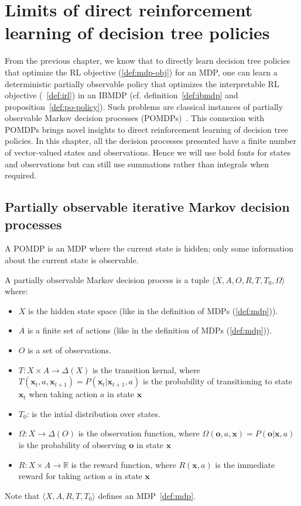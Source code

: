 \chapter{Limits of direct reinforcement learning of decision tree policies}\label{sec:pomdp}

From the previous chapter, we know that to directly learn decision tree policies that optimize the RL objective (\ref{def:mdp-obj}) for an MDP, one can learn a deterministic partially observable policy that optimizes the interpretable RL objective (~\ref{def:irl}) in an IBMDP (cf. definition~\ref{def:ibmdp} and proposition~\ref{def:po-policy}).
Such problems are classical instances of partially observable Markov decision processes (POMDPs)~\cite{POMDP,chap2}.
This connexion with POMDPs brings novel insights to direct reinforcement learning of decision tree policies. 
In this chapter, all the decision processes presented have a finite number of vector-valued states and observations.
Hence we will use bold fonts for states and observations but can still use summations rather than integrals when required.

\section{Partially observable iterative Markov decision processes}\label{sec:poibmdp}
A POMDP is an MDP where the current state is hidden; only some information about the current state is observable.

\begin{definition}\label{def:pomdp}
A partially observable Markov decision process is a tuple $\langle X, A, O, R, T, T_0, \Omega\rangle$ where:
\begin{itemize}
    \item $X$ is the hidden state space (like in the definition of MDPs (\ref{def:mdp})).
    \item $A$ is a finite set of actions (like in the definition of MDPs (\ref{def:mdp})).
    \item $O$ is a set of observations.
    \item $T: X \times A \rightarrow \Delta(X)$ is the transition kernal, where $T(\boldsymbol{x}_t, a, \boldsymbol{x}_{t+1}) = P(\boldsymbol{x}_t|\boldsymbol{x}_{t+1}, a)$ is the probability of transitioning to state $\boldsymbol{x}_{t}$ when taking action $a$ in state $\boldsymbol{x}$
    \item $T_0$: is the intial distribution over states. 
    \item $\Omega: X \rightarrow \Delta(O)$ is the observation function, where $\Omega(\boldsymbol{o}, a, \boldsymbol{x}) = P(\boldsymbol{o}|\boldsymbol{x}, a)$ is the probability of observing $\boldsymbol{o}$ in state $\boldsymbol{x}$
    \item $R: X \times A \rightarrow \mathbb{R}$ is the reward function, where $R(\boldsymbol{x}, a)$ is the immediate reward for taking action $a$ in state $\boldsymbol{x}$
\end{itemize}
Note that $\langle X, A, R, T, T_0 \rangle$ defines an MDP~\ref{def:mdp}.
\end{definition}

